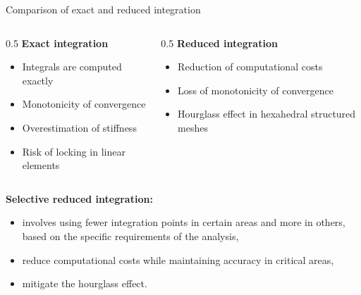 \documentclass[aspectratio=169]{beamer}
\begin{document}
\begin{frame}{Comparison of exact and reduced integration}
    \vspace{0.3cm}
    \begin{columns}
        \begin{column}{0.5\textwidth}
            \textbf{Exact integration}
            \begin{itemize}
                \item[\Checkmark] Integrals are computed exactly
                \item[\Checkmark] Monotonicity of convergence
                \item[\XSolidBrush] Overestimation of stiffness
                \item[\XSolidBrush] Risk of locking in linear elements
            \end{itemize}

        \end{column}

        \begin{column}{0.5\textwidth}
            \textbf{Reduced integration}
            \begin{itemize}
                \item[\Checkmark] Reduction of computational costs
                \item[\XSolidBrush]  Loss of monotonicity of convergence
                \item[\XSolidBrush] Hourglass effect in hexahedral structured meshes
            \end{itemize}
        \end{column}
    \end{columns}
    \vspace{0.4cm}
    \begin{block}{}
        \textbf{Selective reduced integration:}
        \begin{itemize}
            \item involves using fewer integration points in certain areas and more in others, based on the specific requirements of the analysis,
            \item reduce computational costs while maintaining accuracy in critical areas,
            \item mitigate the hourglass effect.
        \end{itemize}
    \end{block}
\end{frame}
\end{document}
